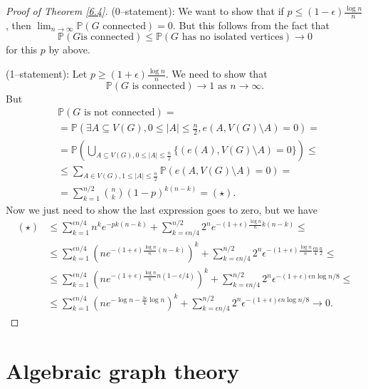 \documentclass{article}
\theoremstyle{definition}
\begin{document}
\begin{proof}[Proof of Theorem \ref{6.4}]
    (0--statement): We want to show that if $p\le (1-\epsilon)\frac{\log n}{n}$, then $\lim_{n \to \infty} \mathbb{P}(G \text{ connected}) = 0$. But this follows from the fact that $$\mathbb{P}(G \text{is connected})\le \mathbb{P}(G \text{ has no isolated vertices}) \to 0$$
    for this $p$ by above.
    \vspace{1mm}
    
    (1--statement): Let $p\ge (1+\epsilon)\frac{\log n}{n}$. We need to show that 
    \[
    \mathbb{P}(G \text{ is connected}) \to 1 \text{ as }n \to \infty.
    \]
    But 
    \begin{align*}
        &\mathbb{P}(G \text{ is not connected}) = \\
        &=\mathbb{P}(\exists A \subseteq V(G), 0\le |A|\le \frac{n}{2}, e(A,V(G)\setminus A)=0) = \\
        & =\mathbb{P}\left( \bigcup_{A \subseteq V(G), 0\le |A|\le \frac{n}{2}} \{(e(A),V(G)\setminus A)=0\}\right) \le \\
        &\le \sum_{A \in V(G), 1\le |A|\le \frac{n}{2}}^{} \mathbb{P}(e(A,V(G)\setminus A)=0) = \\
        &= \sum_{k=1}^{n/2} {n\choose{k}}(1-p)^{k(n-k)} = (\star).
    \end{align*}
    Now we just need to show the last expression goes to zero, but we have
    \begin{align*}
        (\star) &\le \sum_{k=1}^{\epsilon n/4} n^k e^{-pk(n-k)} + \sum_{k=\epsilon n/4}^{n/2} 2^n e^{-(1+\epsilon)\frac{\log n}{n}k(n-k)} \le \\
        &\le \sum_{k=1}^{\epsilon n/4} \left(n e^{-(1+\epsilon)\frac{\log n}{n}(n-k)}\right)^k + \sum_{k=\epsilon n/4}^{n/2} 2^n \epsilon^{-(1+\epsilon)\frac{\log n}{n} \frac{\epsilon n}{4} \frac{n}{2}} \le \\
        &\le \sum_{k=1}^{\epsilon n/4} \left(ne^{-(1+\epsilon)\frac{\log n}{n}n(1-\epsilon/4)}\right)^k + \sum_{k=\epsilon n/4}^{n/2} 2^n \epsilon^{-(1+\epsilon)\epsilon n\log n/8} \le \\
        &\le \sum_{k=1}^{\epsilon n/4} \left( n e^{-\log n - \frac{3 \epsilon}{4}\log n} \right)^k + \sum_{k=\epsilon n/4}^{n/2} 2^n \epsilon^{-(1+\epsilon)\epsilon n\log n/8} \to 0.
    \end{align*} 
\end{proof}

\section{Algebraic graph theory}
\end{document}
